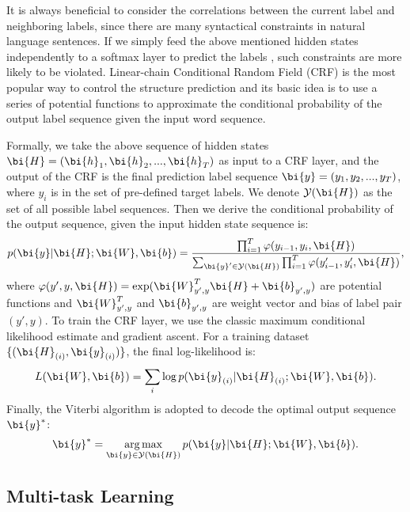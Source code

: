 It is always beneficial to consider the correlations
between the current label and neighboring
labels, since there are many syntactical constraints
in natural language sentences.
If we simply feed the above mentioned hidden states
independently to a softmax layer to predict the labels \cite{hakanni-tur2016multidomain},
such constraints are more likely
to be violated. Linear-chain Conditional Random
Field (CRF) \cite{lafferty2001conditional} 
is the most popular way to control the structure
prediction and its basic idea is to use a series
of potential functions to approximate the conditional
probability of the output label sequence
given the input word sequence.

Formally, we take the above sequence of hidden
states $\bi{H} = (\bi{h}_1, \bi{h}_2, ..., \bi{h}_T)$
as input to a CRF layer,
and the output of the CRF is the final prediction label sequence
$\bi{y} = (y_1, y_2, ..., y_T)$,
where $y_i$ is in the set of pre-defined target labels.
We denote $\mathcal{Y}(\bi{H})$ as the set of all possible label sequences.
Then we derive the conditional probability of the output sequence,
given the input hidden state sequence is:
$$
p(\bi{y}|\bi{H};\bi{W}, \bi{b})=\frac{\prod_{i=1}^{T}\varphi(y_{i-1},y_i,\bi{H})}
{\sum_{\bi{y}'\in\mathcal{Y}(\bi{H})}\prod_{i=1}^{T}\varphi(y'_{i-1},y'_i,\bi{H})},
$$
where $\varphi(y',y,\bi{H})=\exp(\bi{W}_{y',y}^{T}\bi{H}+\bi{b}_{y',y})$ are potential functions and $\bi{W}_{y',y}^{T}$ and $\bi{b}_{y',y}$ are weight vector and bias of label pair $(y', y)$.
To train the CRF layer, we use the classic maximum
conditional likelihood estimate and gradient ascent.
For a training dataset $\{(\bi{H}_{(i)}, \bi{y}_{(i)})\}$, 
the final log-likelihood is:
$$
L(\bi{W},\bi{b}) = \sum_{i}\log p(\bi{y}_{(i)}|\bi{H}_{(i)};\bi{W},\bi{b}).
$$
Finally, the Viterbi algorithm is adopted
to decode the optimal output sequence $\bi{y}^{*}$:
$$
\bi{y}^{*}=\mathop{\arg\max}_{\bi{y}\in\mathcal{Y}(\bi{H})}p(\bi{y}|\bi{H};\bi{W},\bi{b}).
$$

\subsection{Multi-task Learning}

